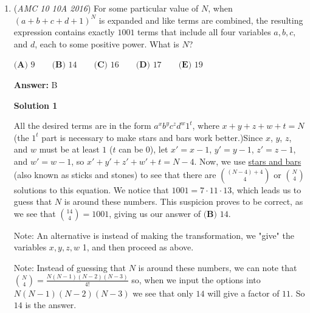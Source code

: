 \begin{enumerate}
We can say that $AQD$ is similar to $BFQ$. $DB=\sqrt{36+9}=3\sqrt{5}$. Therefore, $DQ+QB=3\sqrt{5}$, so $2.5(QB)=3\sqrt{5}$, and $QB=\frac{6\sqrt{5}}{5}$, therfore $DQ=\frac{9\sqrt{5}}{5}$. 

 Let $PQ$ be $x$. We find that $APD$ is similar to $BPE$ and therefore $\frac{\frac{9\sqrt{5}}{5} + x}{\frac{6\sqrt{5}}{5} - x}=\frac{3}{1}$. We simplify to see that $x=\frac{9\sqrt{5}}{20}$. We then see that $\frac{6\sqrt{5}}{5} - \frac{9\sqrt{5}}{20}=\frac{3\sqrt5}{4}$. So $BP=\frac{3\sqrt5}{4}$. We now take the ratio $BP:PQ:QD$ and simplify to find $5:3:12$. So $r+s+t=20$.~jamespudi

 


	\item (\textit{AMC 10 10A 2016}) For some particular value of $N$, when $(a+b+c+d+1)^N$ is expanded and like terms are combined, the resulting expression contains exactly $1001$ terms that include all four variables $a, b,c,$ and $d$, each to some positive power. What is $N$?


 $\textbf{(A) }9 \qquad \textbf{(B) } 14 \qquad \textbf{(C) } 16 \qquad \textbf{(D) } 17 \qquad \textbf{(E) } 19$

 \textbf{Answer: }B



\textbf{Solution 1}

All the desired terms are in the form $a^xb^yc^zd^w1^t$, where $x + y + z + w + t = N$ (the $1^t$ part is necessary to make stars and bars work better.)Since $x$, $y$, $z$, and $w$ must be at least $1$ ($t$ can be $0$), let $x' = x - 1$, $y' = y - 1$, $z' = z - 1$, and $w' = w - 1$, so $x' + y' + z' + w' + t = N - 4$. Now, we use \href{https://artofproblemsolving.com/wiki/index.php?title=Stars\_and\_bars}{stars and bars} (also known as sticks and stones) to see that there are $\binom{(N-4)+4}{4}$ or $\binom{N}{4}$ solutions to this equation. We notice that $1001=7\cdot11\cdot13$, which leads us to guess that $N$ is around these numbers. This suspicion proves to be correct, as we see that $\binom{14}{4} = 1001$, giving us our answer of $\boxed{\textbf{(B) }14.}$

 Note: An alternative is instead of making the transformation, we "give" the variables $x, y, z, w$ 1, and then proceed as above.

 Note: Instead of guessing that $N$ is around these numbers, we can note that $\binom{N}{4} = \frac{N(N-1)(N-2)(N-3)}{4!}$ so, when we input the options into $N(N-1)(N-2)(N-3)$ we see that only $14$ will give a factor of $11$. So $14$ is the answer. 


\end{enumerate}
